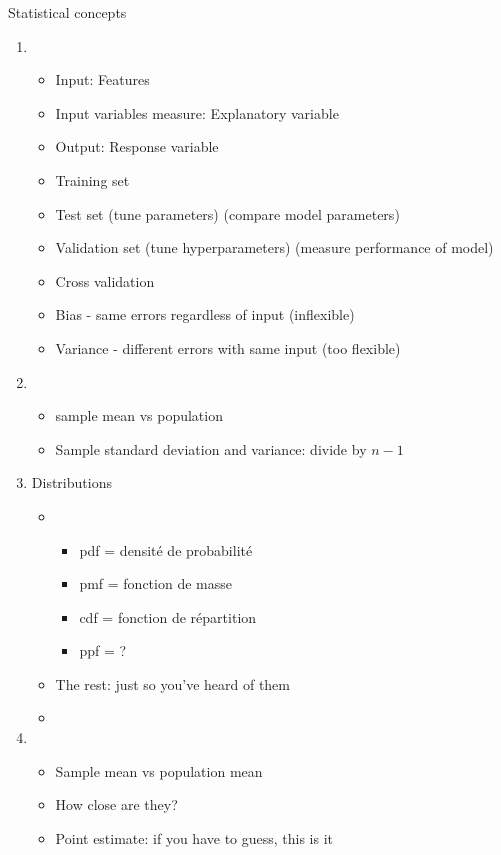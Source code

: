 \documentclass{article}
\begin{document}
Statistical concepts
\begin{enumerate}
\item {}
  \begin{itemize}
  \item Input:  Features
  \item Input variables measure:  Explanatory variable
  \item Output: Response variable
  \item Training set
  \item Test set (tune parameters) (compare model parameters)
  \item Validation set (tune hyperparameters) (measure performance of model)
  \item Cross validation
  \item Bias - same errors regardless of input (inflexible)
  \item Variance - different errors with same input (too flexible)
  \end{itemize}
\item {}
  \begin{itemize}
  \item sample mean vs population 
  \item Sample standard deviation and variance: divide by $n-1$
  \end{itemize}
\item Distributions
  \begin{itemize}
  \item {}
    \begin{itemize}
    \item pdf = densité de probabilité
    \item pmf = fonction de masse
    \item cdf = fonction de répartition
    \item ppf = ?
    \end{itemize}
  \item The rest: just so you've heard of them
  \item {}
  \end{itemize}
\item {}
  \begin{itemize}
  \item Sample mean vs population mean
  \item How close are they?
  \item Point estimate: if you have to guess, this is it

\end{itemize}
\end{enumerate}
\end{document}
